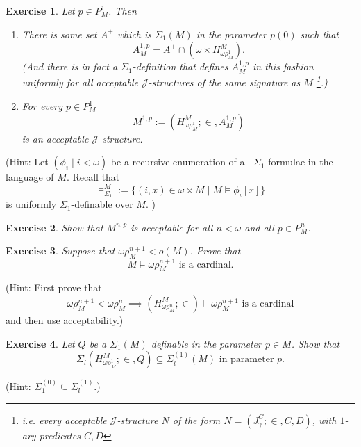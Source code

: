 \documentclass[12pt,a4paper]{article}
\theoremstyle{nicestyle}
\newtheorem{exercise}{Exercise}[subsection]
\begin{document}
\begin{exercise}
  Let $p \in P^{1}_{M}$. Then
  \begin{enumerate}
  \item There is some set $A^{+}$ which is $\Sigma_{1}(M)$ in the
    parameter $p(0)$ such that
    \[
      A^{1,p}_{M} = A^{+} \cap (\omega \times
      H^{M}_{\omega\rho^{1}_{M}}).
    \]
    (And there is in fact a $\Sigma_{1}$-definition that defines
    $A^{1,p}_{M}$ in this fashion uniformly for all acceptable
    $\mathcal{J}$-structures of the same signature as $M$
    \footnote{i.e. every acceptable $\mathcal{J}$-structure $N$ of the
      form $N = (J^{C}_{\gamma}; \in, C, D)$, with $1$-ary predicates $C,D$}.)
  \item For every $p \in P^{1}_{M}$
    \[
      M^{1,p} := (H^{M}_{\omega\rho^{1}_{M}}; \in, A^{1,p}_{M})
    \]
    is an acceptable $\mathcal{J}$-structure.
  \end{enumerate}
\end{exercise}

(Hint: Let $(\phi_{i} \mid i < \omega)$ be a recursive enumeration of all $\Sigma_{1}$-formulae in the language of $M$. Recall that
  \[
    \models^{M}_{\Sigma_{1}} := \{ (i, x) \in \omega \times M \mid M \models \phi_{i}[x] \}
  \]
  is uniformly $\Sigma_{1}$-definable over $M$.  )

  \begin{exercise}
    Show that $M^{n,p}$ is acceptable for all $n < \omega$ and all
    $p \in P^{n}_{M}$.
  \end{exercise}

  \begin{exercise}
    Suppose that $\omega\rho^{n+1}_{M} < o(M)$. Prove that
    \[
      M \models \omega\rho^{n+1}_{M} \text{ is a cardinal.}
    \]
  \end{exercise}

  (Hint: First prove that
  \[
    \omega\rho^{n+1}_{M} < \omega\rho^{n}_{M} \implies
    (H^{M}_{\omega\rho^{n}_{M}}; \in) \models \omega\rho^{n+1}_{M}
    \text{ is a cardinal}
  \]
  and then use acceptability.)

  \begin{exercise}
    Let $Q$ be a $\Sigma_{1}(M)$ definable in the parameter $p \in M$. Show that
    \[
      \Sigma_{l}(H^{M}_{\omega\rho^{1}_{M}}; \in, Q) \subseteq
      \Sigma^{(1)}_{l}(M) \text{ in parameter } p.
    \]
  \end{exercise}

  (Hint: $\Sigma^{(0)}_{1} \subseteq \Sigma^{(1)}_{l}$.)
\end{document}
